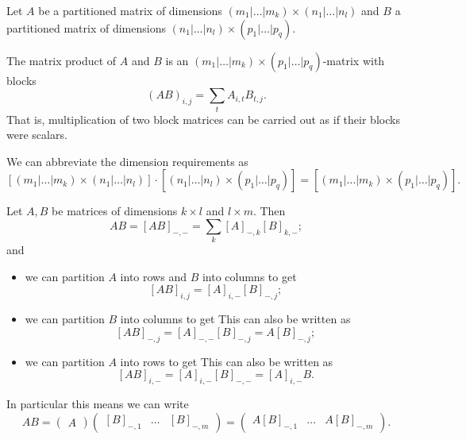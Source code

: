 \begin{proposition}
Let $A$ be a partitioned matrix of dimensions $(m_1|\ldots|m_k) \times (n_1|\ldots|n_l)$ and $B$ a partitioned matrix of dimensions $(n_1|\ldots|n_l)\times (p_1|\ldots|p_q)$.

The matrix product of $A$ and $B$ is an $(m_1|\ldots|m_k) \times (p_1|\ldots|p_q)$-matrix with blocks
\[ (AB)_{i,j} = \sum_{t}A_{i,t}B_{t,j}. \]
That is, multiplication of two block matrices can be carried out as if their blocks were scalars.
\end{proposition}
We can abbreviate the dimension requirements as
\[ [(m_1|\ldots|m_k) \times (n_1|\ldots|n_l)]\cdot[(n_1|\ldots|n_l)\times (p_1|\ldots|p_q)] = [(m_1|\ldots|m_k) \times (p_1|\ldots|p_q)]. \]
\begin{corollary} \label{corollary:multiplicationBlockMatrices}
Let $A,B$ be matrices of dimensions $k\times l$ and $l \times m$. Then
\[ AB = [AB]_{-,-} = \sum_k[A]_{-,k}[B]_{k, -}; \]
and
\begin{itemize}
\item we can partition $A$ into rows and $B$ into columns to get
\[ [AB]_{i,j} = [A]_{i,-}[B]_{-, j}; \]
\item we can partition $B$ into columns to get
This can also be written as
\[ [AB]_{-, j} = [A]_{-,-}[B]_{-,j} = A[B]_{-, j}; \]
\item we can partition $A$ into rows to get
This can also be written as
\[ [AB]_{i, -} = [A]_{i,-}[B]_{-,-} = [A]_{i,-}B. \]
\end{itemize}
\end{corollary}
In particular this means we can write
\[ AB = \begin{pmatrix}
A
\end{pmatrix} \begin{pmatrix}
[B]_{-,1} & \hdots & [B]_{-, m}
\end{pmatrix} = \begin{pmatrix}
A[B]_{-,1} & \hdots & A[B]_{-,m}
\end{pmatrix}. \]

